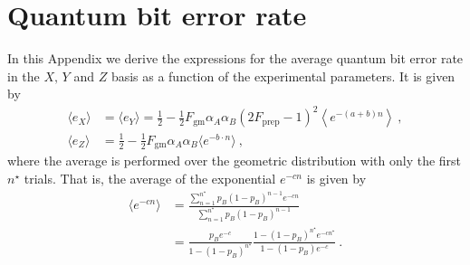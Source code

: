 \documentclass[aps,pra,reprint,superscriptaddress]{revtex4-1}
\newcommand{\nstar}{n^{\star}}
\begin{document}
\section{Quantum bit error rate}
\label{sec:QBER}
In this Appendix we derive the expressions for the average quantum bit error rate in the $X, \, Y$ and $Z$ basis as a function of the experimental parameters. It is given by
\begin{align}
\langle e_X\rangle	&= \langle e_Y\rangle =\frac{1}{2}-\frac{1}{2}F_{\mathrm{gm}}\alpha_A \alpha_B\left(2F_{\textrm{prep}}-1\right)^2\left\langle e^{-\left(a+b\right)n} \right\rangle\ ,\\
\langle e_Z\rangle	&= \frac{1}{2}-\frac{1}{2}F_{\mathrm{gm}}\alpha_A \alpha_B\langle e^{-b\cdot n}\rangle\ ,
\end{align}
where the average is performed over the geometric distribution with only the first $\nstar$ trials. That is, the average of the exponential $e^{-cn}$ is given by
\begin{align}
\langle e^{-cn} \rangle &= \frac{\sum_{n=1}^{\nstar}p_B\left(1-p_B\right)^{n-1}e^{-cn}}{\sum_{n=1}^{\nstar}p_B\left(1-p_B\right)^{n-1}}\\
&=\frac{p_Be^{-c}}{1-\left(1-p_B\right)^{\nstar}}\frac{1-\left(1-p_B\right)^{\nstar}e^{-c\nstar}}{1-\left(1-p_B\right)e^{-c}}\label{eq:averageexp}\ . \nonumber
\end{align}
\end{document}
